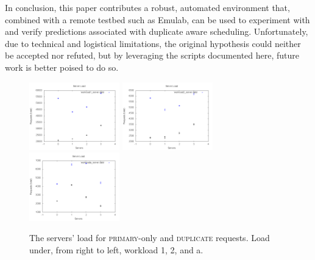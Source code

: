 \documentclass[11pt,titlepage]{article}
\begin{document}
In conclusion, this paper contributes a robust, automated environment that,
combined with a remote testbed such as Emulab, can be used to experiment with
and verify predictions associated with duplicate aware scheduling.
Unfortunately, due to technical and logistical limitations, the original
hypothesis could neither be accepted nor refuted, but by leveraging the scripts
documented here, future work is better poised to do so.

\begin{figure}[h!]
  \centering
  \includegraphics[width=0.35\textwidth]{workload1_load.png}
  \includegraphics[width=0.35\textwidth]{workload2_load.png}
  \includegraphics[width=0.35\textwidth]{workloada_load.png}
  \caption[Server load]{The servers' load for \textsc{primary}-only and
  \textsc{duplicate} requests. Load under, from right to left, workload 1, 2,
  and a. }
  \label{load}
\end{figure}
\end{document}
